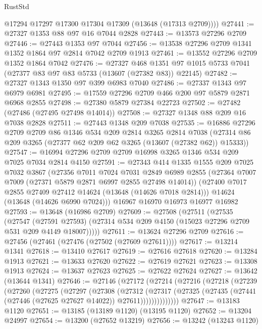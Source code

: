 \begin{lexlean}{RustStd}
\begin{coremodule}
        @17294
        @17297
        @17300
        @17304
        @17309
        (@13648 (@17313 @2709))))
@27441 := @27327 @1353 @88 @97 @16 @7044 @2828
@27443 := @13573 @27296 @2709
@27446 := @27443 @1353 @97 @7044
@27456 := @13538 @27296 @2709 @1341 @1352 @1864 @97 @2814 @7042 @2709 @1913
@27461 := @13552 @27296 @2709 @1352 @1864 @7042
@27476 := @27327
    @468
    @1351
    @97
    @1015
    @5733
    @7041
    (@27377 @83 @97 @83 @5733 (@13607 (@27382 @83)) @22145)
@27482 := @27327 @1343 @1350 @97 @399 @6983 @7040
@27486 := @27337 @1343 @97 @6979 @6981
@27495 := @17559 @27296 @2709 @466 @200 @97 @5879 @2871 @6968 @2855
@27498 := @27380 @5879 @27384 @22723
@27502 := @27482 (@27486 (@27495 @27498 @14014))
@27508 := @27327 @1348 @88 @209 @16 @7038 @2828
@27511 := @27443 @1348 @209 @7038
@27535 := @16886
    @27296
    @2709
    @2709
    @86
    @1346
    @534
    @209
    @2814
    @3265
    @2814
    @7038
    (@27314 @86 @209 @3265 (@27377 @62 @209 @62 @3265 (@13607 (@27382 @62)) @15333))
@27547 := @16994 @27296 @2709 @2709 @16998 @3265 @1346 @534 @209 @7025 @7034 @2814 @4150
@27591 := @27343
    @414
    @1335
    @1555
    @209
    @7025
    @7032
    @3867
    (@27356
      @7011
      @7024
      @7031
      @2849
      @6989
      @2855
      (@27364 @7007 @7009 (@27371 @5879 @2871 @6997 @2855 @27498 @14014))
      (@27400 @7017 @2855 @27409 @27412 @14624 (@13648 (@14626 @7018 @2814)))
      @14624
      (@13648 (@14626 @6990 @7024)))
    @16967
    @16970
    @16973
    @16977
    @16982
@27593 := @13648 (@16986 @2709)
@27609 := @27508
    (@27511
      (@27535
        (@27547
          (@27591 @27593)
          (@27314 @534 @209 @4150 (@15023 @27296 @2709 @531 @209 @4149 @18007)))))
@27611 := @13624 @27296 @2709
@27616 := @27456 (@27461 (@27476 (@27502 (@27609 @27611))))
@27617 := @13214 @1341
@27618 := @13410 @27617
@27619 := @27616 @27618
@27620 := @13284 @1913
@27621 := @13633 @27620
@27622 := @27619 @27621
@27623 := @13308 @1913
@27624 := @13637 @27623
@27625 := @27622 @27624
@27627 := @13642 (@13644 @1341)
@27646 := @27146
    (@27172
      (@27214
        (@27216
          (@27218
            (@27239
              (@27260
                (@27275
                  (@27297
                    (@27308
                      (@27312
                        (@27317
                          (@27325
                            (@27435 (@27441 (@27446 (@27625 @27627 @14022)) @27611))))))))))))))
@27647 := @13183 @1120
@27651 := @13185 (@13189 @1120) (@13195 @1120)
@27652 := @13204 @24997
@27654 := @13200 (@27652 @13219)
@27656 := @13242 (@13243 @1120)

\end{coremodule}
\end{lexlean}
